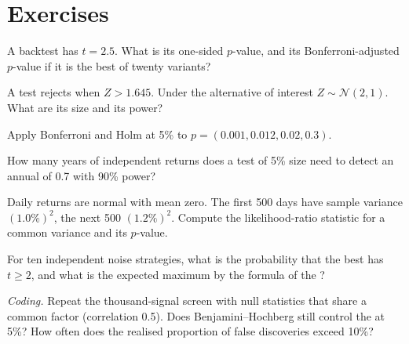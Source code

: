 \section{Exercises}

\begin{exercise}[$\star$]\label{exo:qm:testing-and-multiple-testing:1}
A backtest has $t = 2.5$. What is its one-sided $p$-value, and its Bonferroni-adjusted $p$-value if it is the best of twenty
variants?
\end{exercise}

\begin{exercise}[$\star$]\label{exo:qm:testing-and-multiple-testing:2}
A test rejects when $Z > 1.645$. Under the alternative of interest $Z \sim \mathcal N(2, 1)$. What are its size and its power?
\end{exercise}

\begin{exercise}[$\star$]\label{exo:qm:testing-and-multiple-testing:3}
Apply Bonferroni and Holm at 5\% to $p = (0.001, 0.012, 0.02, 0.3)$.
\end{exercise}

\begin{exercise}[$\star\star$]\label{exo:qm:testing-and-multiple-testing:4}
How many years of independent returns does a test of 5\% size need to detect an annual  of 0.7 with 90\% power?
\end{exercise}

\begin{exercise}[$\star\star$]\label{exo:qm:testing-and-multiple-testing:5}
Daily returns are normal with mean zero. The first 500 days have sample variance $(1.0\%)^2$, the next 500 $(1.2\%)^2$. Compute the
likelihood-ratio statistic for a common variance and its $p$-value.
\end{exercise}

\begin{exercise}[$\star\star$]\label{exo:qm:testing-and-multiple-testing:6}
For ten independent noise strategies, what is the probability that the best has $t \ge 2$, and what is the expected maximum by the
formula of the ?
\end{exercise}

\begin{exercise}[$\star\star\star$]\label{exo:qm:testing-and-multiple-testing:7}
\emph{Coding.} Repeat the thousand-signal screen with null statistics that share a common factor (correlation 0.5). Does
Benjamini--Hochberg still control the  at 5\%? How often does the realised proportion of false discoveries
exceed 10\%?
\end{exercise}

